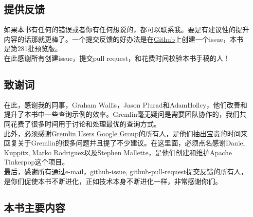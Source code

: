 \documentclass[UTF8]{ctexart}
\begin{document}
\subsection{提供反馈}
\indent 如果本书有任何的错误或者你有任何想说的，都可以联系我。要是有建议性的提升内容的话那就更棒了。一个提交反馈的好办法是在\href{https://github.com/krlawrence/graph}{Github}上创建一个issue，本书是第281批预览版。\\
\indent 在此感谢所有创建issue，提交pull request，和花费时间校验本书手稿的人！

\subsection{致谢词}
\indent 在此，感谢我的同事，Graham Wallis，Jason Plurad和AdamHolley，他们改善和提升了本书中一些查询示例的效率。Gremlin毫无疑问是需要团队协作的，我们共同花费了很多时间用于讨论和处理最优的查询方式。\\
\indent 此外，必须感谢\href{https://groups.google.com/forum/#!forum/gremlin-users}{Gremlin Users Google Group}的所有人，是他们抽出宝贵的时间来回复关于Gremlin的很多问题并且提了不少建议。在这里面，必须点名感谢Daniel Kuppitz, Marko Rodriguez以及Stephen Mallette，是他们创建和维护Apache Tinkerpop这个项目。\\
\indent 最后，感谢所有通过e-mail，github-issue, github-pull-request提交反馈的所有人，是你们促使本书不断进化，正如技术本身不断进化一样，非常感谢你们。

\subsection{本书主要内容}
\end{document}

